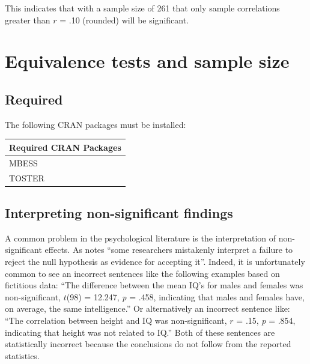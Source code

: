 \documentclass[
]{krantz}
\begin{document}
This indicates that with a sample size of 261 that only sample correlations greater than \(r\) = .10 (rounded) will be significant.

\hypertarget{equivalence-tests-and-sample-size}{%
\chapter{Equivalence tests and sample size}\label{equivalence-tests-and-sample-size}}

\hypertarget{required-4}{%
\section{Required}\label{required-4}}

The following CRAN packages must be installed:

\begin{longtable}[]{@{}l@{}}
\toprule
Required CRAN Packages \\
\midrule
\endhead
MBESS \\
TOSTER \\
\bottomrule
\end{longtable}

\hypertarget{interpreting-non-significant-findings}{%
\section{Interpreting non-significant findings}\label{interpreting-non-significant-findings}}

A common problem in the psychological literature is the interpretation of non-significant effects. As \citep[Kirk][]{kirk1996practical} notes ``some researchers mistakenly interpret a failure to reject the null hypothesis as evidence for accepting it''. Indeed, it is unfortunately common to see an incorrect sentences like the following examples based on fictitious data: ``The difference between the mean IQ's for males and females was non-significant, \(t\)(98) = 12.247, \emph{p} = .458, indicating that males and females have, on average, the same intelligence.'' Or alternatively an incorrect sentence like: ``The correlation between height and IQ was non-significant, \(r\) = .15, \emph{p} = .854, indicating that height was not related to IQ.'' Both of these sentences are statistically incorrect because the conclusions do not follow from the reported statistics.
\end{document}

